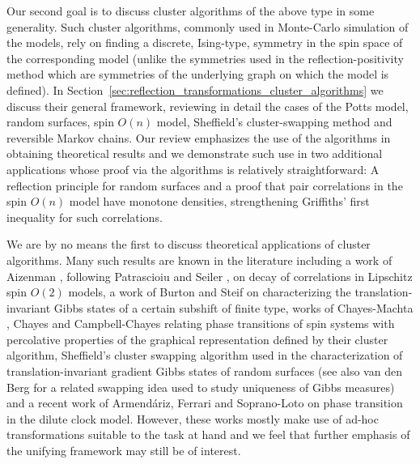 \documentclass[english]{article}
\theoremstyle{plain}
\theoremstyle{plain}
\begin{document}
Our second goal is to discuss cluster algorithms of the above type in some generality. Such cluster algorithms, commonly used in Monte-Carlo simulation of the models, rely on finding a discrete, Ising-type, symmetry in the spin space
of the corresponding model (unlike the symmetries used in the reflection-positivity method which are symmetries of the underlying graph on which the model is defined). In Section~\ref{sec:reflection_transformations_cluster_algorithms} we discuss their general framework, reviewing in detail the cases of the Potts model, random surfaces, spin $O(n)$ model, Sheffield's cluster-swapping method and reversible Markov chains. Our review emphasizes the use of the algorithms in obtaining theoretical results and we demonstrate such use in two additional applications whose proof via the algorithms is relatively straightforward: A reflection principle for random surfaces and a proof that pair correlations in the spin $O(n)$ model have monotone densities, strengthening Griffiths' first inequality \cite{Gri67, Gin70} for such correlations.

We are by no means the first to discuss theoretical applications of cluster algorithms. Many such results are known in the literature including a work
of Aizenman \cite{aizenman1994slow}, following Patrascioiu and
Seiler \cite{patrascioiu1992phase}, on decay of correlations in
Lipschitz spin $O(2)$ models, a work of Burton and Steif \cite[Section 2]{burton1995new} on
characterizing the translation-invariant Gibbs states of a certain
subshift of finite type, works of Chayes-Machta \cite{chayes1997graphical, chayes1998graphical}, Chayes \cite{chayes1998discontinuity} and Campbell-Chayes \cite{campbell1998isotropic} relating phase transitions of spin systems with percolative properties of the graphical representation defined by their cluster algorithm, Sheffield's cluster swapping algorithm
\cite[Chapter~8]{sheffield2005random} used in the characterization
of translation-invariant gradient Gibbs states of random surfaces
(see also van den Berg \cite{van1993uniqueness} for a related
swapping idea used to study uniqueness of Gibbs measures) and a recent
work of Armend{\'a}riz, Ferrari and Soprano-Loto
\cite{armendariz2015phase} on phase transition in the dilute clock
model. However, these works mostly make use of ad-hoc transformations suitable to the task at hand and we feel that further emphasis of the unifying framework may still be of interest.
\end{document}
